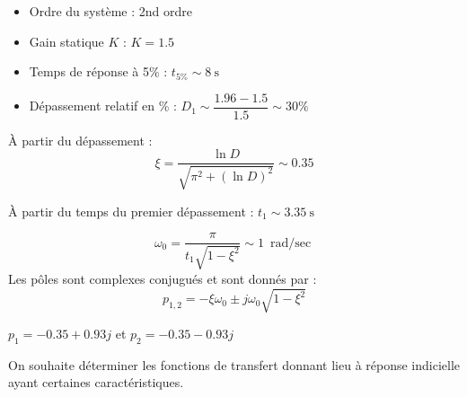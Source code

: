 \begin{center}
    
\end{center}
\begin{itemize}
    \item Ordre du système : 2nd ordre 
    \item Gain statique $K$ : $K=1.5$ 
    \item Temps de réponse à 5\% : $t_{5\%}\sim\SI{8}{\second}$ 
    \item Dépassement relatif en \% : $D_1\sim\dfrac{1.96-1.5}{1.5}\sim30\%$ 
\end{itemize}

\`A partir du dépassement : 
\[
\xi=\dfrac{\ln{D}}{\sqrt{\pi^2+(\ln{D})^2}}\sim0.35 
\]

\`A partir du temps du premier dépassement :
$t_1\sim\SI{3.35}{\second}$

\[
\omega_0=\dfrac{\pi}{t_1\sqrt{1-\xi^2}}\sim\SI{1}{\radian\per\sec} 
\]
Les pôles sont complexes conjugués et sont donnés par : 
\[
p_{1,2}=-\xi\omega_0\pm j\omega_0\sqrt{1-\xi^2}
\]

$p_1=-0.35+0.93j$ et $p_2=-0.35-0.93j$

On souhaite déterminer les fonctions de transfert donnant lieu à réponse 
indicielle ayant certaines caractéristiques.
\acpl


